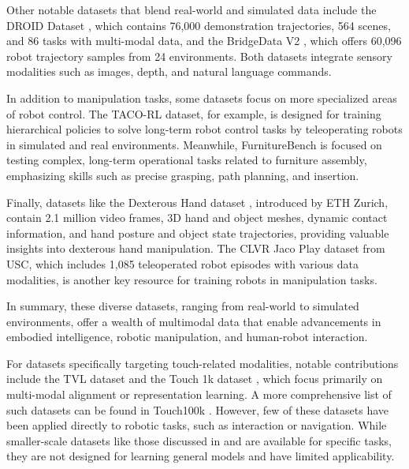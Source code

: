 Other notable datasets that blend real-world and simulated data include the DROID Dataset  \cite{khazatsky2024droid}, which contains 76,000 demonstration trajectories, 564 scenes, and 86 tasks with multi-modal data, and the BridgeData V2  \cite{walke2023bridgedata}, which offers 60,096 robot trajectory samples from 24 environments. Both datasets integrate sensory modalities such as images, depth, and natural language commands.

In addition to manipulation tasks, some datasets focus on more specialized areas of robot control. The TACO-RL  \cite{rosete2022tacorl} dataset, for example, is designed for training hierarchical policies to solve long-term robot control tasks by teleoperating robots in simulated and real environments. Meanwhile, FurnitureBench  \cite{heo2023furniturebench} is focused on testing complex, long-term operational tasks related to furniture assembly, emphasizing skills such as precise grasping, path planning, and insertion.

Finally, datasets like the Dexterous Hand dataset  \cite{fan2023arctic}, introduced by ETH Zurich, contain 2.1 million video frames, 3D hand and object meshes, dynamic contact information, and hand posture and object state trajectories, providing valuable insights into dexterous hand manipulation. The CLVR Jaco Play dataset  \cite{dass2023jacoplay} from USC, which includes 1,085 teleoperated robot episodes with various data modalities, is another key resource for training robots in manipulation tasks.

In summary, these diverse datasets, ranging from real-world to simulated environments, offer a wealth of multimodal data that enable advancements in embodied intelligence, robotic manipulation, and human-robot interaction.

For datasets specifically targeting touch-related modalities, notable contributions include the TVL dataset \cite{fu2024touch} and the Touch 1k dataset \cite{cheng2024touch100k}, which focus primarily on multi-modal alignment or representation learning. A more comprehensive list of such datasets can be found in Touch100k \cite{cheng2024touch100k}. However, few of these datasets have been applied directly to robotic tasks, such as interaction or navigation. While smaller-scale datasets like those discussed in  \cite{calandra2018more} and  \cite{han2024learning} are available for specific tasks, they are not designed for learning general models and have limited applicability.

